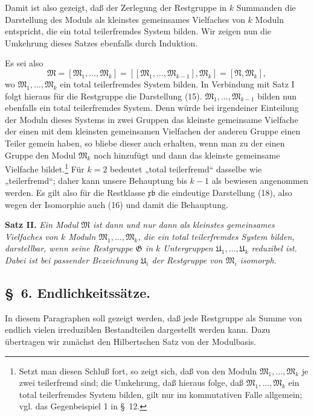 \documentclass[11pt]{article}
\newcommand{\mM}{\mathfrak{M}}
\newcommand{\mN}{\mathfrak{N}}
\newcommand{\mG}{\mathfrak{G}}
\newcommand{\mb}{\mathfrak{b}}
\newcommand{\mx}{\mathfrak{x}}
\providecommand{\mU}{\mathfrak{U}}
\begin{document}
Damit ist also gezeigt, daß der Zerlegung der Restgruppe in $k$ Summanden die Darstellung des Moduls als kleinstes gemeinsames Vielfaches von $k$ Moduln entspricht, die ein total teilerfremdes System bilden. Wir zeigen nun die Umkehrung dieses Satzes ebenfalls durch Induktion.

Es sei also
\[
 \mM=[\mM_1,\ldots,\mM_k]=[[\mM_1,\ldots,\mM_{k-1}],\mM_k]=[\mN,\mM_k],
\]
wo $\mM_1,\ldots,\mM_k$ ein total teilerfremdes System bilden. In Verbindung mit Satz I folgt hieraus für die Restgruppe die Darstellung (15). $\mM_1,\ldots,\mM_{k-1}$ bilden nun ebenfalls ein total teilerfremdes System. Denn würde bei irgendeiner Einteilung der Moduln dieses Systems in zwei Gruppen das kleinste gemeinsame Vielfache der einen mit dem kleinsten gemeinsamen Vielfachen der anderen Gruppe einen Teiler gemein haben, so bliebe dieser auch erhalten, wenn man zu der einen Gruppe den Modul $\mM_k$ noch hinzufügt und dann das kleinste gemeinsame Vielfache bildet.\footnote{Setzt man diesen Schluß fort, so zeigt sich, daß von den Moduln $\mM_1,\ldots,\mM_k$ je zwei teilerfremd sind; die Umkehrung, daß hieraus folge, daß $\mM_1,\ldots,\mM_k$ ein total teilerfremdes System bilden, gilt nur im kommutativen Falle allgemein; vgl. das Gegenbeispiel 1 in \S~12.} Für $k=2$ bedeutet „total teilerfremd“ dasselbe wie „teilerfremd“; daher kann unsere Behauptung bis $k-1$ als bewiesen angenommen werden. Es gilt also für die Restklasse $\mx\overline{\mb}$ die eindeutige Darstellung (18), also wegen der Isomorphie auch (16) und damit die Behauptung.

\textbf{Satz II.} \emph{Ein Modul $\mM$ ist dann und nur dann als kleinstes gemeinsames Vielfaches von $k$ Moduln $\mM_1,\ldots,\mM_k$, die ein total teilerfremdes System bilden, darstellbar, wenn seine Restgruppe $\mG$ in $k$ Untergruppen $\mU_1,\ldots,\mU_k$ reduzibel ist. Dabei ist bei passender Bezeichnung $\mU_i$ der Restgruppe von $\mM_i$ isomorph.}

\subsection*{\S~6. Endlichkeitssätze.}

In diesem Paragraphen soll gezeigt werden, daß jede Restgruppe als Summe von endlich vielen irreduziblen Bestandteilen dargestellt werden kann. Dazu übertragen wir zunächst den Hilbertschen Satz von der Modulbasis.
\end{document}
